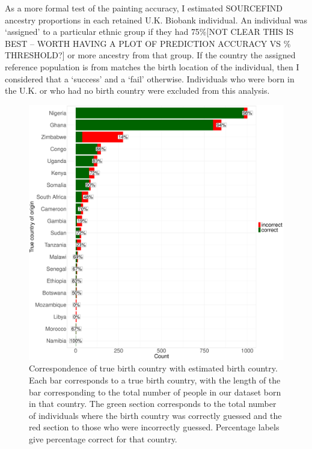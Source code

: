 As a more formal test of the painting accuracy, I estimated SOURCEFIND ancestry proportions in each retained U.K. Biobank individual. An individual was `assigned' to a particular ethnic group if they had {\color{red}75\%[NOT CLEAR THIS IS BEST -- WORTH HAVING A PLOT OF PREDICTION ACCURACY VS \% THRESHOLD?]} or more ancestry from that group. If the country the assigned reference population is from matches the birth location of the individual, then I considered that a `success' and a `fail' otherwise. Individuals who were born in the U.K. or who had no birth country were excluded from this analysis. 

\begin{figure}[htp]
    \centering
    \includegraphics[width=1.0\textwidth]{../images/chapter3/country_of_origin_allInds.pdf}
    \caption{Correspondence of true birth country with estimated birth country. Each bar corresponds to a true birth country, with the length of the bar corresponding to the total number of people in our dataset born in that country. The green section corresponds to the total number of individuals where the birth country was correctly guessed and the red section to those who were incorrectly guessed. Percentage labels give percentage correct for that country.}
    \label{fig:country_of_origin_allInds}
\end{figure}

